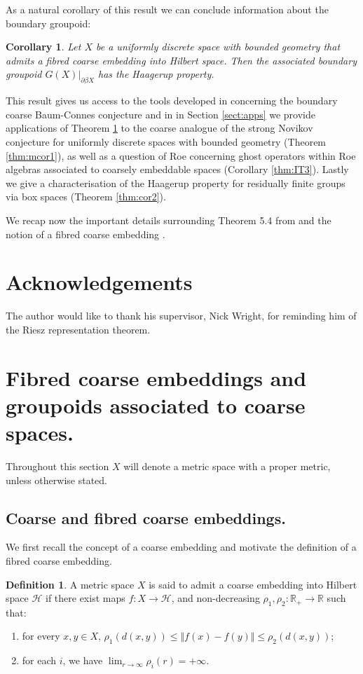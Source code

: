 \documentclass[11pt]{amsart}
\theoremstyle{plain}
\newtheorem{corollary}[theorem]{Corollary}%
\theoremstyle{definition}%
\newtheorem{definition}[theorem]{Definition}%
\theoremstyle{remark}%
\begin{document}
As a natural corollary of this result we can conclude information about the boundary groupoid:

\begin{corollary}\label{Thm:MT1}
Let $X$ be a uniformly discrete space with bounded geometry that admits a fibred coarse embedding into Hilbert space. Then the associated boundary groupoid $G(X)|_{\partial\beta X}$ has the Haagerup property.
\end{corollary}

This result gives us access to the tools developed in \cite{mypub1} concerning the boundary coarse Baum-Connes conjecture and in in Section \ref{sect:apps} we provide applications of Theorem \ref{Thm:MT1} to the coarse analogue of the strong Novikov conjecture for uniformly discrete spaces with bounded geometry (Theorem \ref{thm:mcor1}), as well as a question of Roe concerning ghost operators within Roe algebras associated to coarsely embeddable spaces (Corollary \ref{thm:IT3}). Lastly we give a characterisation of the Haagerup property for residually finite groups via box spaces (Theorem \ref{thm:cor2}).

We recap now the important details surrounding Theorem 5.4 from \cite{MR1905840} and the notion of a fibred coarse embedding \cite{FCEpaper}.

\section*{Acknowledgements}
The author would like to thank his supervisor, Nick Wright, for reminding him of the Riesz representation theorem.

\section{Fibred coarse embeddings and groupoids associated to coarse spaces.}\label{sect:coarse}
Throughout this section $X$ will denote a metric space with a proper metric, unless otherwise stated.

\subsection{Coarse and fibred coarse embeddings.}
We first recall the concept of a coarse embedding and motivate the definition of a fibred coarse embedding.

\begin{definition}\label{def:FCE}
A metric space $X$ is said to admit a coarse embedding into Hilbert space $\mathcal{H}$ if there exist maps $f:X \rightarrow \mathcal{H}$,  and non-decreasing $\rho_{1},\rho_{2}:\mathbb{R}_{+} \rightarrow \mathbb{R}$ such that:
\begin{enumerate}
\item for every $x,y \in X$, $\rho_{1}(d(x,y)) \leq \Vert f(x) - f(y) \Vert \leq \rho_{2}(d(x,y))$;
\item for each $i$, we have $\lim_{r \rightarrow \infty}\rho_{i}(r) = +\infty$.
\end{enumerate}
\end{definition}
\end{document}
